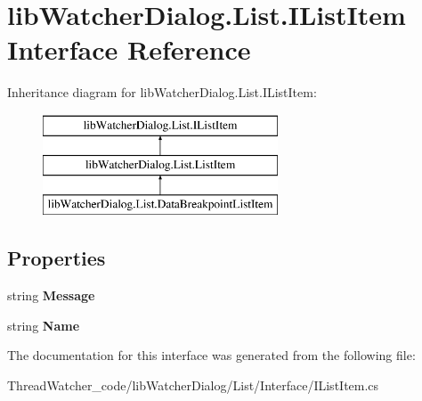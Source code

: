 \hypertarget{interfacelib_watcher_dialog_1_1_list_1_1_i_list_item}{\section{lib\+Watcher\+Dialog.\+List.\+I\+List\+Item Interface Reference}
\label{interfacelib_watcher_dialog_1_1_list_1_1_i_list_item}
}
Inheritance diagram for lib\+Watcher\+Dialog.\+List.\+I\+List\+Item\+:\begin{figure}[H]
\begin{center}
\leavevmode
\includegraphics[height=3.000000cm]{interfacelib_watcher_dialog_1_1_list_1_1_i_list_item}
\end{center}
\end{figure}
\subsection*{Properties}
\begin{DoxyCompactItemize}
\item 
\hypertarget{interfacelib_watcher_dialog_1_1_list_1_1_i_list_item_a38d01c6fe13ad4e2a0778a48c809f1de}{string {\bfseries Message}}\label{interfacelib_watcher_dialog_1_1_list_1_1_i_list_item_a38d01c6fe13ad4e2a0778a48c809f1de}

\item 
\hypertarget{interfacelib_watcher_dialog_1_1_list_1_1_i_list_item_a9680d4d95be9313703620516caac3323}{string {\bfseries Name}}\label{interfacelib_watcher_dialog_1_1_list_1_1_i_list_item_a9680d4d95be9313703620516caac3323}

\end{DoxyCompactItemize}


The documentation for this interface was generated from the following file\+:\begin{DoxyCompactItemize}
\item 
Thread\+Watcher\+\_\+code/lib\+Watcher\+Dialog/\+List/\+Interface/I\+List\+Item.\+cs\end{DoxyCompactItemize}

